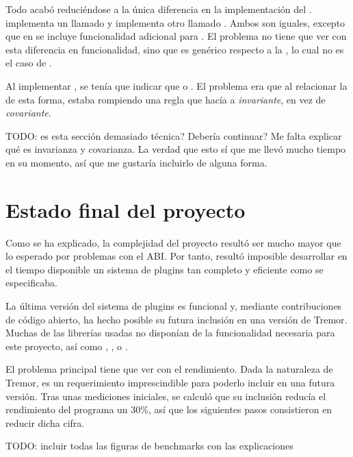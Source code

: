 Todo acabó reduciéndose a la única diferencia en la implementación del \trait
{}.  implementa un \trait llamado
 y  implementa otro llamado
. Ambos \traits son iguales, excepto que en 
se incluye funcionalidad adicional para \abistable. El problema no tiene que ver
con esta diferencia en funcionalidad, sino que  es
genérico respecto a la \lifetime {}, lo cual no es el caso de
.

Al implementar , se tenía que indicar que  o . El problema era que al relacionar la \lifetime {} de
esta forma, estaba rompiendo una regla que hacía a 
\emph{invariante}, en vez de \emph{covariante}.

TODO: es esta sección demasiado técnica? Debería continuar? Me falta explicar
qué es invarianza y covarianza. La verdad que esto sí que me llevó mucho tiempo
en su momento, así que me gustaría incluirlo de alguna forma.

\section{Estado final del proyecto}

Como se ha explicado, la complejidad del proyecto resultó ser mucho mayor que lo
esperado por problemas con el ABI. Por tanto, resultó imposible desarrollar en
el tiempo disponible un sistema de plugins tan completo y eficiente como se
especificaba.

La última versión del sistema de plugins es funcional y, mediante contribuciones
de código abierto, ha hecho posible su futura inclusión en una versión de
Tremor. Muchas de las librerías usadas no disponían de la funcionalidad
necesaria para este proyecto, así como , ,
 o .

El problema principal tiene que ver con el rendimiento. Dada la naturaleza de
Tremor, es un requerimiento imprescindible para poderlo incluir en una futura
versión. Tras unas mediciones iniciales, se calculó que su inclusión reducía el
rendimiento del programa un 30\%, así que los siguientes pasos consistieron en
reducir dicha cifra.

TODO: incluir todas las figuras de benchmarks con las explicaciones
